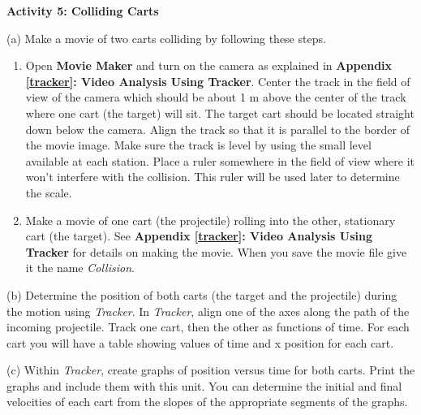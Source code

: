 \vspace{10mm}

\textbf{Activity 5: Colliding Carts }

(a) Make a movie of two carts colliding by following these steps. 

\begin{enumerate}
\item Open \textbf{Movie Maker} and turn on the camera as explained in \textbf{Appendix \ref{tracker}: Video Analysis Using Tracker}. Center the track in the field of view of the 
camera which should be about 1 m above the center of the track where one cart (the target) will
sit. The target cart should be located straight down below the camera. Align the track so that it is parallel to the border of the movie image. Make sure the track is level by using the small level available at each station. Place a ruler somewhere in the field of view where it won't interfere with the collision. This ruler will be used later to determine the scale. 
\item Make a movie of one cart (the projectile) rolling into the other, stationary
cart (the target). See \textbf{Appendix \ref{tracker}: Video Analysis Using Tracker} for details on making the movie. When you save the movie file give it the name \textit{Collision}.
\end{enumerate}
(b) Determine the position of both carts (the target and the projectile) during
the motion using \textit{Tracker}. In \textit{Tracker}, align one of the axes along the path 
of the incoming projectile. Track one cart, then the other as functions of time. For each cart 
you will have a table showing values of time and x position for each cart.

(c) Within \textit{Tracker}, create graphs of position versus time for both carts. Print the 
graphs and include them with this unit. You can determine the initial and final velocities 
of each cart from the slopes of the appropriate segments of the graphs.

